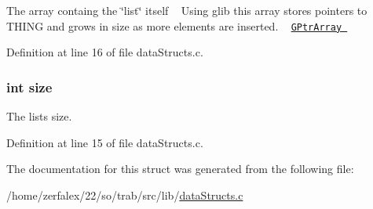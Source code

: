 The array containg the \char`\"{}list\char`\"{} itself  ~\newline
 Using glib this array stores pointers to T\+H\+I\+NG and grows in size as more elements are inserted. ~\newline
 \href{https://developer.gnome.org/glib/stable/glib-Pointer-Arrays.html}{\tt G\+Ptr\+Array  } 



Definition at line 16 of file data\+Structs.\+c.

\subsubsection[{\texorpdfstring{size}{size}}]{\setlength{\rightskip}{0pt plus 5cm}int size}\hypertarget{structlist_a439227feff9d7f55384e8780cfc2eb82}{}\label{structlist_a439227feff9d7f55384e8780cfc2eb82}


The list\textquotesingle{}s size. 



Definition at line 15 of file data\+Structs.\+c.



The documentation for this struct was generated from the following file\+:\begin{DoxyCompactItemize}
\item 
/home/zerfalex/22/so/trab/src/lib/\hyperlink{data_structs_8c}{data\+Structs.\+c}\end{DoxyCompactItemize}
